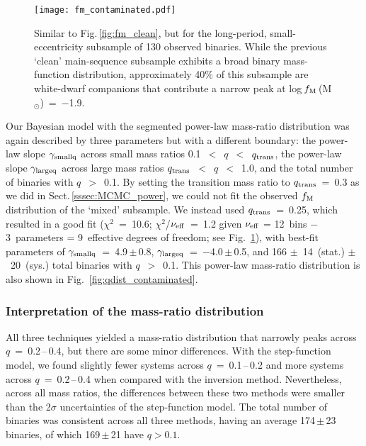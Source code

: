 \documentclass[a4paper,fleqn,usenatbib]{mnras}
\begin{document}
\begin{figure}
\centering
\texttt{[image: fm\_contaminated.pdf]}
\caption{Similar to Fig.\,\ref{fig:fm_clean}, but for the long-period, small-eccentricity subsample of 130 observed binaries.  While the previous `clean' main-sequence subsample exhibits a broad binary mass-function distribution, approximately 40\% of this subsample are white-dwarf companions that contribute a narrow peak at log\,$f_{\rm M}$\,(M$_{\odot}$)~=~$-$1.9.}
\label{fig:fm_contaminated}
\end{figure}


Our Bayesian model with the segmented power-law mass-ratio distribution was again described by three parameters but with a different boundary: the power-law slope $\gamma_{\rm smallq}$ across small mass ratios 0.1~$<$~$q$~$<$~$q_{\rm trans}$, the power-law slope $\gamma_{\rm largeq}$ across large mass ratios $q_{\rm trans}$~$<$~$q$~$<$~1.0, and the total number of binaries with $q$~$>$~0.1.  By setting the transition mass ratio to $q_{\rm trans}$~=~0.3 as we did in Sect.\,\ref{sssec:MCMC_power}, we could not fit the observed $f_{\rm M}$ distribution of the `mixed' subsample.  We instead used $q_{\rm trans}$~=~0.25, which resulted in a good fit ($\chi^2$~=~10.6; $\chi^2$/$\nu_{\rm eff}$~=~1.2 given $\nu_{\rm eff}$ = 12~bins $-$ 3~parameters = 9~effective degrees of freedom; see Fig.~\ref{fig:fm_contaminated}), with best-fit parameters of $\gamma_{\rm smallq}$~=~4.9\,$\pm$\,0.8, $\gamma_{\rm largeq}$~=~$-$4.0\,$\pm$\,0.5, and 166 $\pm$~14~(stat.) $\pm$~20~(sys.) total binaries with $q$~$>$~0.1.  This power-law mass-ratio distribution is also shown in Fig.~\ref{fig:qdist_contaminated}.


\subsubsection{Interpretation of the mass-ratio distribution}

All three techniques yielded a mass-ratio distribution that narrowly peaks across $q$~=~0.2\,--\,0.4, but there are some minor differences.  With the step-function model, we found slightly fewer systems across $q$~=~0.1\,--\,0.2 and more systems across $q$~=~0.2\,--\,0.4 when compared with the inversion method.  Nevertheless, across all mass ratios, the differences between these two methods were smaller than the 2$\sigma$ uncertainties of the step-function model. The total number of binaries was consistent across all three methods, having an average 174\,$\pm$\,23 binaries, of which 169\,$\pm$\,21 have $q>0.1$.
\end{document}
